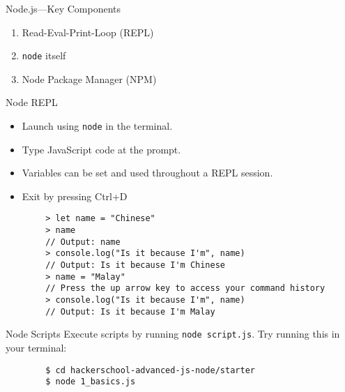 \documentclass{beamer}
\begin{document}
\begin{frame}[fragile]{Node.js---Key Components}
    \begin{enumerate}
        \item Read-Eval-Print-Loop (REPL)
        \item \texttt{node} itself
        \item Node Package Manager (NPM)
    \end{enumerate}
\end{frame}

\begin{frame}[fragile]{Node REPL}
    \begin{itemize}
        \item Launch using \texttt{node} in the terminal.
        \item Type JavaScript code at the prompt.
        \item Variables can be set and used throughout a REPL session.
        \item Exit by pressing Ctrl+D
    \end{itemize}
    \begin{verbatim}
        > let name = "Chinese"
        > name
        // Output: name
        > console.log("Is it because I'm", name)
        // Output: Is it because I'm Chinese
        > name = "Malay"
        // Press the up arrow key to access your command history
        > console.log("Is it because I'm", name)
        // Output: Is it because I'm Malay
    \end{verbatim}
\end{frame}

\begin{frame}[fragile]{Node Scripts}
    Execute scripts by running \texttt{node script.js}. Try running this in your terminal:
    \begin{verbatim}
        $ cd hackerschool-advanced-js-node/starter
        $ node 1_basics.js
    \end{verbatim}
\end{frame}
\end{document}

